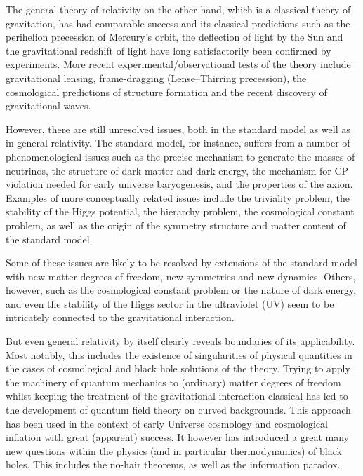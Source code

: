 \documentclass[11pt]{book}
\numberwithin{equation}{chapter}
\begin{document}
The general theory of relativity on the other hand, which is a classical theory of gravitation,
has had comparable success and its
classical predictions such as the perihelion precession of Mercury's orbit, the deflection of light by the Sun
and the gravitational redshift of light have long satisfactorily been confirmed by experiments.
More recent experimental/observational tests of the theory include gravitational lensing,
frame-dragging (Lense–Thirring precession),
the cosmological predictions of structure formation
and the recent discovery of gravitational waves.

However, there are still unresolved issues, both in the standard model as well
as in general relativity.
The standard model, for instance, suffers from a number of phenomenological issues such as
the precise mechanism to generate the masses of neutrinos,
the structure of dark matter and dark energy,
the mechanism for CP violation needed for early universe baryogenesis,
and the properties of the axion.
Examples of more conceptually related issues include the triviality problem,
the stability of the Higgs potential,
the hierarchy problem,
the cosmological constant problem,
as well as
the origin of the symmetry structure and matter content of the standard model.

Some of these issues are likely to be resolved by extensions of the standard model
with new matter degrees of freedom, new symmetries and new dynamics. Others, however,
such as the cosmological constant problem or the nature of dark energy,
and even the stability of the Higgs sector
in the ultraviolet (UV) seem to be intricately connected to the gravitational interaction.

But even general relativity by itself clearly reveals boundaries of its applicability.
Most notably, this includes the existence of singularities of physical quantities
in the cases of cosmological and black hole solutions of the theory.
Trying to apply the machinery of quantum mechanics to (ordinary) matter degrees of freedom
whilst keeping the treatment of the gravitational interaction classical has led
to the development of quantum field theory on curved backgrounds. This approach has
been used in the context of early Universe cosmology and cosmological inflation with
great (apparent) success. It however has introduced a great many new questions within
the physics (and in particular thermodynamics) of black holes. This includes the
no-hair theorems, as well as the information paradox.
\end{document}
